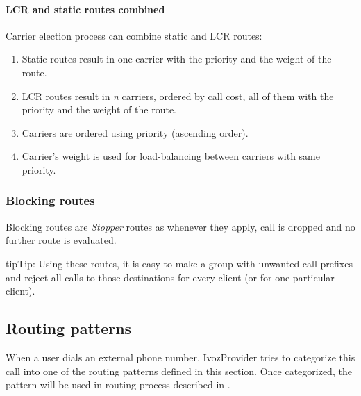 \documentclass[letterpaper,10pt,english]{sphinxmanual}
\begin{document}
\paragraph{LCR and static routes combined}
\label{administration_portal/brand/routing/outgoing_routings:lcr-and-static-routes-combined}
Carrier election process can combine static and LCR routes:
\begin{enumerate}
\item {} 
Static routes result in one carrier with the priority and the weight of the route.

\item {} 
LCR routes result in \emph{n} carriers, ordered by call cost, all of them with the priority and the weight of the route.

\item {} 
Carriers are ordered using priority (ascending order).

\item {} 
Carrier's weight is used for load-balancing between carriers with same priority.

\end{enumerate}


\subsubsection{Blocking routes}
\label{administration_portal/brand/routing/outgoing_routings:blocking-routes}
Blocking routes are \emph{Stopper} routes as whenever they apply, call is dropped and no further route is evaluated.

\begin{notice}{tip}{Tip:}
Using these routes, it is easy to make a group with unwanted call prefixes and reject all calls to those
destinations for every client (or for one particular client).
\end{notice}
\label{administration_portal/brand/routing/routing_patterns:routing-patterns}

\subsection{Routing patterns}
\label{administration_portal/brand/routing/routing_patterns:id2}\label{administration_portal/brand/routing/routing_patterns::doc}\label{administration_portal/brand/routing/routing_patterns:routing-patterns}\label{administration_portal/brand/routing/routing_patterns:id1}
When a user dials an external phone number, IvozProvider tries to categorize
this call into one of the routing patterns defined in this section. Once categorized,
the pattern will be used in routing process described in {\hyperref[administration_portal/brand/routing/outgoing_routings:outgoing\string-routings]{}}.
\end{document}
